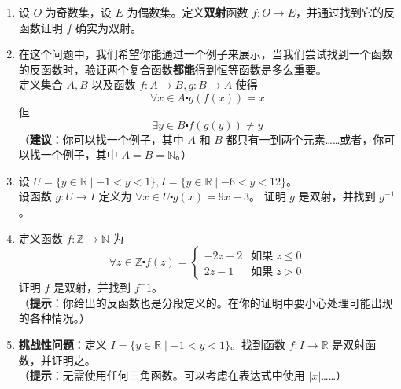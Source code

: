 \begin{enumerate}[label=(\arabic*)]
    \item 设 $O$ 为奇数集，设 $E$ 为偶数集。定义\textbf{双射}函数 $f : O \to E$，并通过找到它的反函数证明 $f$ 确实为双射。
    \item 在这个问题中，我们希望你能通过一个例子来展示，当我们尝试找到一个函数的反函数时，验证两个复合函数\textbf{都能}得到恒等函数是多么重要。\\
    定义集合 $A, B$ 以及函数 $f : A \to B, g : B \to A$ 使得
    \[\forall x \in A \centerdot g(f(x)) = x\]
    但
    \[\exists y \in B \centerdot f(g(y)) \ne y\]
    （\textbf{建议}：你可以找一个例子，其中 $A$ 和 $B$ 都只有一到两个元素……或者，你可以找一个例子，其中 $A=B=\mathbb{N}$。）
    \item 设 $U = \{y \in \mathbb{R} \mid -1 < y < 1\}, I = \{y \in \mathbb{R} \mid -6 < y < 12\}$。\\
        设函数 $g : U \to I$ 定义为 $\forall x \in U \centerdot g(x) = 9x + 3$。
        证明 $g$ 是双射，并找到 $g^{-1}$。
    \item 定义函数 $f : \mathbb{Z} \to \mathbb{N}$ 为
    \[\forall z \in \mathbb{Z} \centerdot f(z) = \begin{cases}
        -2z + 2 & \text{如果}\; z \le 0 \\
        2z-1 & \text{如果}\; z > 0
    \end{cases}\]
    证明 $f$ 是双射，并找到 $f^-1$。\\
    （\textbf{提示}：你给出的反函数也是分段定义的。在你的证明中要小心处理可能出现的各种情况。）
    \item \textbf{挑战性问题}：定义 $I = \{y \in \mathbb{R} \mid -1 < y < 1\}$。找到函数 $f : I \to \mathbb{R}$ 是双射函数，并证明之。\\
    （\textbf{提示}：无需使用任何三角函数。可以考虑在表达式中使用 $|x|$……）\label{exc:exercises7.5.5}
\end{enumerate}